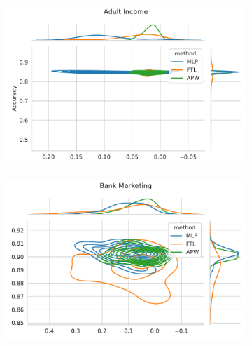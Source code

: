 \begin{figure}
\centering
\caption{Metric distribution optimizing Accuracy and Equal Opportunity in comparison with Fair Transition Loss across multiple resample runs. Corresponding values available at Table~\ref{tab:complete_acc_opportunity}.}
\label{fig:complete_acc_opportunity}
\begin{subfigure}{.45\linewidth}
    \includegraphics[width=1\linewidth]{images/pareto_acc_opportunity_adult.pdf}
\end{subfigure}
\begin{subfigure}{.45\linewidth}
    \includegraphics[width=1\linewidth]{images/pareto_acc_opportunity_bank.pdf}
\end{subfigure}


\end{figure}
